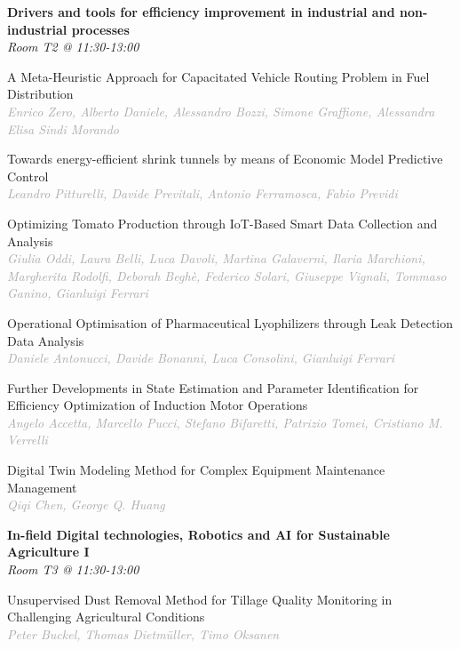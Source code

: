 \begin{multicols*}{2}
\normalsize \textbf{Drivers and tools for efficiency improvement in industrial and non-industrial processes}\\
\small \textit{Room T2 @ 11:30-13:00}

\small A Meta-Heuristic Approach for Capacitated Vehicle Routing Problem in Fuel Distribution\\ 
\footnotesize \textcolor{darkgray}{\textit{Enrico Zero, Alberto  Daniele, Alessandro  Bozzi, Simone  Graffione, Alessandra Elisa Sindi  Morando}}

\small Towards energy-efficient shrink tunnels by means of Economic Model Predictive Control\\ 
\footnotesize \textcolor{darkgray}{\textit{Leandro Pitturelli, Davide  Previtali, Antonio  Ferramosca, Fabio  Previdi}}

\small Optimizing Tomato Production through IoT-Based Smart Data Collection and Analysis\\ 
\footnotesize \textcolor{darkgray}{\textit{Giulia Oddi, Laura  Belli, Luca  Davoli, Martina  Galaverni, Ilaria  Marchioni, Margherita  Rodolfi, Deborah  Beghè, Federico  Solari, Giuseppe  Vignali, Tommaso  Ganino, Gianluigi  Ferrari}}

\small Operational Optimisation of Pharmaceutical Lyophilizers through Leak Detection Data Analysis\\ 
\footnotesize \textcolor{darkgray}{\textit{Daniele Antonucci, Davide  Bonanni, Luca  Consolini, Gianluigi  Ferrari}}

\small Further Developments in State Estimation and Parameter Identification for Efficiency Optimization of Induction Motor Operations\\ 
\footnotesize \textcolor{darkgray}{\textit{Angelo Accetta, Marcello  Pucci, Stefano  Bifaretti, Patrizio  Tomei, Cristiano M.  Verrelli}}

\small Digital Twin Modeling Method for Complex Equipment Maintenance Management\\ 
\footnotesize \textcolor{darkgray}{\textit{Qiqi Chen, George Q.  Huang}}

\normalsize \textbf{In-field Digital technologies, Robotics and AI for Sustainable Agriculture I}\\
\small \textit{Room T3 @ 11:30-13:00}

\small Unsupervised Dust Removal Method for Tillage Quality Monitoring in Challenging Agricultural Conditions\\ 
\footnotesize \textcolor{darkgray}{\textit{Peter Buckel, Thomas  Dietmüller, Timo  Oksanen}}


\end{multicols*}
